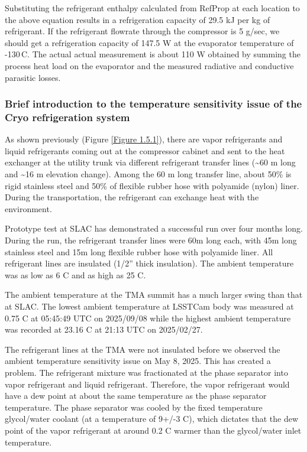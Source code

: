 Substituting the refrigerant enthalpy calculated from RefProp at each location to the above equation results in a refrigeration capacity of 29.5 kJ per kg of refrigerant. If the refrigerant flowrate through the compressor is 5 g/sec, we should get a refrigeration capacity of 147.5 W at the evaporator temperature of -130\,\degree C. The actual actual measurement is about 110 W obtained by summing the process heat load on the evaporator and the measured radiative and conductive parasitic losses.

\subsubsection{Brief introduction to the temperature sensitivity issue of the Cryo refrigeration system}
\label{sec:cryo-tempsens-intro}

As shown previously (Figure \ref{Figure 1.5.1}), there are vapor refrigerants and liquid refrigerants coming out at the compressor cabinet and sent to the heat exchanger at the utility trunk via different refrigerant transfer lines (\textasciitilde60 m long and \textasciitilde16 m elevation change). Among the 60 m long transfer line, about 50\% is rigid stainless steel and 50\% of flexible rubber hose with polyamide (nylon) liner. During the transportation, the refrigerant can exchange heat with the environment.

Prototype test at SLAC has demonstrated a successful run over four months long. During the run, the refrigerant transfer lines were 60m long each, with 45m long stainless steel and 15m long flexible rubber hose with polyamide liner. All refrigerant lines are insulated (1/2'' thick insulation). The ambient temperature was as low as 6 C and as high as 25 C.

The ambient temperature at the TMA summit has a much larger swing than that at SLAC. The lowest ambient temperature at LSSTCam body was measured at 0.75 C at 05:45:49 UTC on 2025/09/08 while the highest ambient temperature was recorded at 23.16 C at 21:13 UTC on 2025/02/27.

The refrigerant lines at the TMA were not insulated before we observed the ambient temperature sensitivity issue on May 8, 2025. This has created a problem. The refrigerant mixture was fractionated at the phase separator into vapor refrigerant and liquid refrigerant. Therefore, the vapor refrigerant would have a dew point at about the same temperature as the phase separator temperature. The phase separator was cooled by the fixed temperature glycol/water coolant (at a temperature of 9+/-3 C), which dictates that the dew point of the vapor refrigerant at around 0.2 C warmer than the glycol/water inlet temperature.

